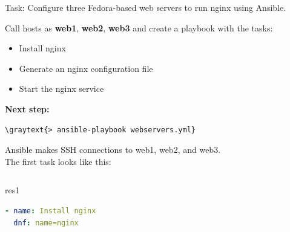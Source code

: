 \documentclass[pdf, 8pt, unicode, t]{beamer} %
\newcommand{\graytext}[1]{{\usebeamercolor[fg]{graytext_color}#1}}
\begin{document}
\begin{frame}[fragile]
\begin{block}{Task:}
Configure three Fedora-based web servers to run nginx using Ansible.
\end{block}
\vspace{1em}
Call hosts as {\bf web1}, {\bf web2}, {\bf web3} and create a playbook with the tasks:
\begin{itemize}
\item Install nginx
\item Generate an nginx configuration file
\item Start the nginx service
\end{itemize}
\vspace*{2em}
{\bf Next step:}\\
\begin{Verbatim}[commandchars=\\\{\}]
\graytext{> ansible-playbook webservers.yml}
\end{Verbatim}
Ansible makes SSH connections to web1, web2, and web3.\\
\vspace{2em}
The first task looks like this:
\vspace{2em}
\begin{columns}[t]
\begin{beamercolorbox}[sep=-1.0em,rounded=true,shadow=true,center]{res1}
\begin{lstlisting}[language=yaml]
- name: Install nginx
  dnf: name=nginx
\end{lstlisting}
\end{beamercolorbox}
\end{columns}
\end{frame}
\end{document}

